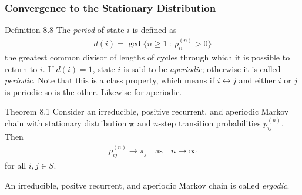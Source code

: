 \subsubsection{Convergence to the Stationary Distribution}
\begin{boks}{Definition 8.8}
  The \textit{period} of state $i$ is defined as
  \begin{align*}
    d(i) = \gcd \{ n \geq 1 \ : \ p_{ii}^{(n)} > 0 \}
  \end{align*}
  the greatest common divisor of lengths of cycles through which it is possible to return to $i$. If $d(i) = 1$, state $i$ is said to be \textit{aperiodic}; otherwise it is called \textit{periodic}. Note that this is a class property, which means if $i \leftrightarrow j$ and either $i$ or $j$ is periodic so is the other. Likewise for aperiodic.
\end{boks}
\begin{boks}{Theorem 8.1}
  Consider an irreducible, positive recurrent, and aperiodic Markov chain with stationary distribution $\boldsymbol{\pi}$ and $n$-step transition probabilities $p_{ij}^{(n)}$. Then
  \begin{align*}
    p_{ij}^{(n)} \rightarrow \pi_j \quad \text{as} \quad n \rightarrow \infty
  \end{align*}
  for all $i,j \in S$.
\end{boks}
An irreducible, positve recurrent, and aperiodic Markov chain is called \textit{ergodic}.
